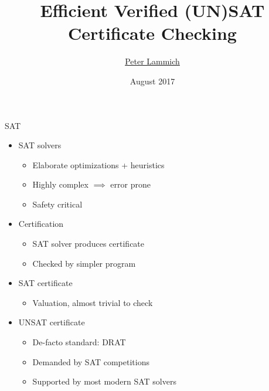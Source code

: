 \documentclass[fleqn]{beamer}
\title{Efficient Verified (UN)SAT Certificate Checking}
\author[Peter Lammich]{\underline{Peter Lammich}}
\institute[TUM] %
{ TU M\"unchen %
}
\date {August 2017}
\begin{document}
% 

\begin{frame}
  \titlepage
\end{frame}


\begin{frame}{SAT}
  \begin{itemize}
   \item<+-> SAT solvers
    \begin{itemize}
     \item Elaborate optimizations + heuristics
     \item Highly complex $\implies$ error prone
     \item Safety critical
    \end{itemize}
   \item<+-> Certification
    \begin{itemize}
     \item SAT solver produces certificate
     \item Checked by simpler program
    \end{itemize}
   \item<+-> SAT certificate
    \begin{itemize}
     \item Valuation, almost trivial to check
    \end{itemize}
   \item<+-> UNSAT certificate
    \begin{itemize}
     \item De-facto standard: DRAT
     \item Demanded by SAT competitions
     \item Supported by most modern SAT solvers
    
    \end{itemize}
  \end{itemize}
\end{frame}
\end{document}
